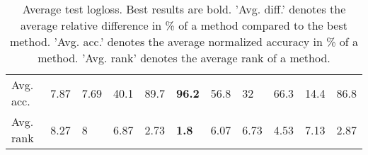 \begin{table}[ht!]
\begin{tabular}{lllllllllll}
  Avg. acc. & 7.87 & 7.69 & 40.1 & 89.7 & \textbf{96.2} & 56.8 & 32 & 66.3 & 14.4 & 86.8 \\ 
  Avg. rank & 8.27 & 8 & 6.87 & 2.73 & \textbf{1.8} & 6.07 & 6.73 & 4.53 & 7.13 & 2.87 \\ 
   \hline
\hline
\end{tabular}
\endgroup
\caption{Average test logloss. 
                  Best results are bold. 
                  'Avg. diff.' denotes the average relative difference in \% of a method compared to the best method.
                  'Avg. acc.' denotes the average normalized accuracy in \% of a method.
                  'Avg. rank' denotes the average rank of a method.} 
\label{TABLES/table_results_logloss_spatial_depth}
\end{table}
